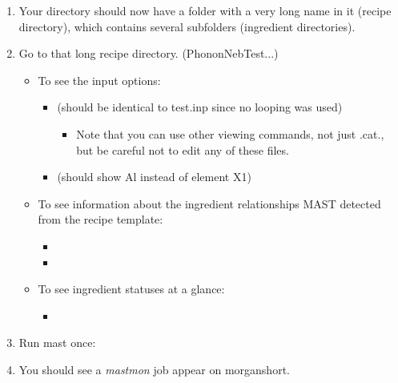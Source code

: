 \documentclass[letterpaper,10pt,english]{sphinxmanual}
\begin{document}
\begin{enumerate}
\begin{itemize}
\end{itemize}

\item {} 
Your  directory should now have a folder with a very long name in it (recipe directory), which contains several subfolders (ingredient directories).

\item {} 
Go to that long recipe directory. (PhononNebTest...)
\begin{itemize}
\item {} 
To see the input options:
\begin{itemize}
\item {} 
 (should be identical to test.inp since no looping was used)
\begin{itemize}
\item {} 
Note that you can use other viewing commands, not just .cat., but be careful not to edit any of these files.

\end{itemize}

\item {} 
 (should show Al instead of element X1)

\end{itemize}

\item {} 
To see information about the ingredient relationships MAST detected from the recipe template:
\begin{itemize}
\item {} 

\item {} 

\end{itemize}

\item {} 
To see ingredient statuses at a glance:
\begin{itemize}
\item {} 

\end{itemize}

\end{itemize}

\item {} 
Run mast once: 

\item {} 
You should see a \emph{mastmon} job appear on morganshort.


\end{enumerate}
\end{document}
